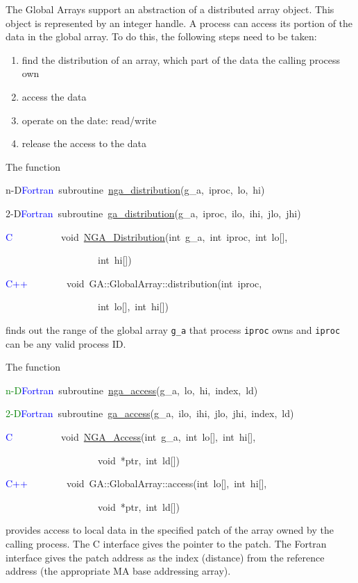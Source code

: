 The Global Arrays support an abstraction of a distributed array object.
This object is represented by an integer handle. A process can access
its portion of the data in the global array. To do this, the following
steps need to be taken:
\begin{enumerate}
\item find the distribution of an array, which part of the data the calling
process own 
\item access the data 
\item operate on the date: read/write 
\item release the access to the data
\end{enumerate}
The function
\begin{lyxcode}
n-D\textcolor{blue}{Fortran}~subroutine~\href{http://www.emsl.pnl.gov/docs/global/ga_ops.html\#ga_distribute}{nga\_{}distribution}(g\_a,~iproc,~lo,~hi)~

2-D\textcolor{blue}{Fortran}~subroutine~\href{http://www.emsl.pnl.gov/docs/global/ga_ops.html\#ga_distribute}{ga\_{}distribution}(g\_a,~iproc,~ilo,~ihi,~jlo,~jhi)

\textcolor{blue}{C}~~~~~~~~~~void~\href{http://www.emsl.pnl.gov/docs/global/c_nga_ops.html\#ga_distribute}{NGA\_{}Distribution}(int~g\_a,~int~iproc,~int~lo{[}{]},~

~~~~~~~~~~~~~~~~~~~int~hi{[}{]})

\textcolor{blue}{C++}~~~~~~~~void~GA::GlobalArray::distribution(int~iproc,~

~~~~~~~~~~~~~~~~~~~int~lo{[}{]},~int~hi{[}{]})
\end{lyxcode}
finds out the range of the global array \texttt{g\_a} that process
\texttt{iproc} owns and \texttt{iproc} can be any valid process ID.

The function
\begin{lyxcode}
\textcolor{green}{n-D}\textcolor{blue}{Fortran}~subroutine~\href{http://www.emsl.pnl.gov/docs/global/ga_ops.html\#ga_access}{nga\_{}access}(g\_a,~lo,~hi,~index,~ld)~

\textcolor{green}{2-D}\textcolor{blue}{Fortran}~subroutine~\href{http://www.emsl.pnl.gov/docs/global/ga_ops.html\#ga_access}{ga\_{}access}(g\_a,~ilo,~ihi,~jlo,~jhi,~index,~ld)

\textcolor{blue}{C}~~~~~~~~~~void~\href{http://www.emsl.pnl.gov/docs/global/c_nga_ops.html\#ga_access}{NGA\_{}Access}(int~g\_a,~int~lo{[}{]},~int~hi{[}{]},

~~~~~~~~~~~~~~~~~~~void~{*}ptr,~int~ld{[}{]})~

\textcolor{blue}{C++~}~~~~~~~void~GA::GlobalArray::access(int~lo{[}{]},~int~hi{[}{]},~

~~~~~~~~~~~~~~~~~~~void~{*}ptr,~int~ld{[}{]})
\end{lyxcode}
provides access to local data in the specified patch of the array
owned by the calling process. The C interface gives the pointer to
the patch. The Fortran interface gives the patch address as the index
(distance) from the reference address (the appropriate MA base addressing
array).

